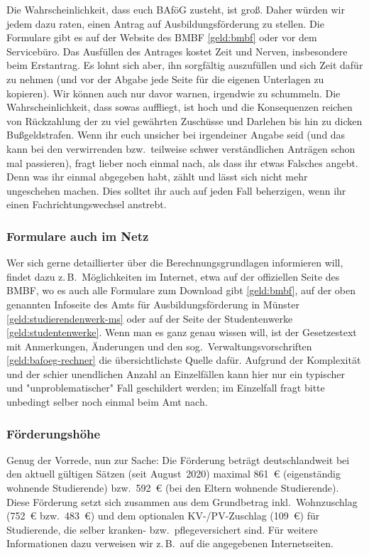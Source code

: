 \begin{multicols*}{2}
Die Wahrscheinlichkeit, dass euch BAföG zusteht, ist groß.
Daher würden wir jedem dazu raten, einen Antrag auf Ausbildungsförderung zu stellen.
Die Formulare gibt es auf der Website des BMBF \cref{geld:bmbf} oder vor dem Servicebüro.
Das Ausfüllen des Antrages kostet Zeit und Nerven, insbesondere beim Erstantrag.
Es lohnt sich aber, ihn sorgfältig auszufüllen und sich Zeit dafür zu nehmen (und vor der Abgabe jede Seite für die eigenen Unterlagen zu kopieren).
Wir können auch nur davor warnen, irgendwie zu schummeln.
Die Wahrscheinlichkeit, dass sowas auffliegt, ist hoch und die Konsequenzen reichen von Rückzahlung der zu viel gewährten Zuschüsse und Darlehen bis hin zu dicken Bußgeldstrafen.
Wenn ihr euch unsicher bei irgendeiner Angabe seid (und das kann bei den verwirrenden bzw.\ teilweise schwer verständlichen Anträgen schon mal passieren), fragt lieber noch einmal nach, als dass ihr etwas Falsches angebt.
Denn was ihr einmal abgegeben habt, zählt und lässt sich nicht mehr ungeschehen machen.
Dies solltet ihr auch auf jeden Fall beherzigen, wenn ihr einen Fachrichtungswechsel anstrebt.

\subsubsection{Formulare auch im Netz}
Wer sich gerne detaillierter über die Berechnungsgrundlagen informieren will, findet dazu z.\,B.\ Möglichkeiten im Internet, etwa auf der offiziellen Seite des BMBF, wo es auch alle Formulare zum Download gibt \cref{geld:bmbf}, auf der oben genannten Infoseite des Amts für Ausbildungsförderung in Münster \cref{geld:studierendenwerk-ms} oder auf der Seite der Studentenwerke \cref{geld:studentenwerke}.
Wenn man es ganz genau wissen will, ist der Gesetzestext mit Anmerkungen, Änderungen und den sog.\ Verwaltungsvorschriften \cref{geld:bafoeg-rechner} die übersichtlichste Quelle dafür.
Aufgrund der Komplexität und der schier unendlichen Anzahl an Einzelfällen kann hier nur ein typischer und "unproblematischer" Fall geschildert werden; im Einzelfall fragt bitte unbedingt selber noch einmal beim Amt nach.

\subsubsection{Förderungshöhe}
Genug der Vorrede, nun zur Sache: Die Förderung beträgt deutschlandweit bei den aktuell gültigen Sätzen (seit August~2020) maximal \SI{861}{\euro} (eigenständig wohnende Studierende) bzw.\ \SI{592}{\euro} (bei den Eltern wohnende Studierende).
Diese Förderung setzt sich zusammen aus dem Grundbetrag inkl.\ Wohnzuschlag (\SI{752}{\euro} bzw.\ \SI{483}{\euro}) und dem optionalen KV-/PV-Zuschlag (\SI{109}{\euro}) für Studierende, die selber kranken- bzw.\ pflegeversichert sind.
Für weitere Informationen dazu verweisen wir z.\,B.\ auf die angegebenen Internetseiten.


\end{multicols*}

